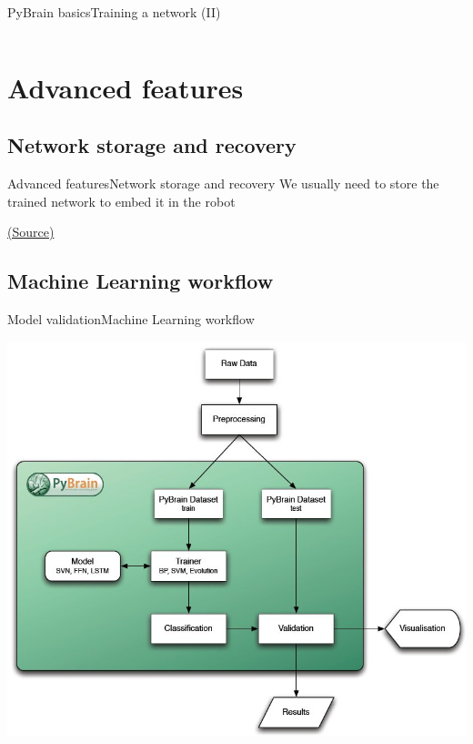 \documentclass[10pt,compress]{beamer} %
\begin{document}
\begin{frame}{PyBrain basics}{Training a network (II)}
\small{
    \begin{columns}
 	   \column{\textwidth}
    	\begin{block}{}
       \vspace{-0.2cm}
       
       \vspace{-0.2cm}
    	\end{block}
	\end{columns}
}
\end{frame}

\section{Advanced features}
\subsection{Network storage and recovery}
\begin{frame}{Advanced features}{Network storage and recovery}
	We usually need to store the trained network to embed it in the robot
    	\begin{block}{}
       \vspace{-0.2cm}
       
       \vspace{-0.2cm}
    	\end{block}
		\small \href{http://stackoverflow.com/questions/6006187/how-to-save-and-recover-pybrain-training}{(Source)}
\end{frame}

\subsection{Machine Learning workflow}
\begin{frame}{Model validation}{Machine Learning workflow}
	\begin{center}
	\includegraphics[width=0.7\linewidth]{figs/mlworkflow.jpg}
	\end{center}
\end{frame}
\end{document}
